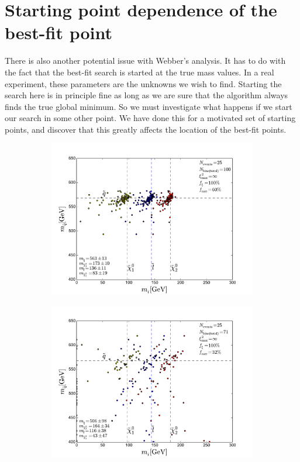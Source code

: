 \documentclass[twoside,english]{uiofysmaster}
\begin{document}
\section{Starting point dependence of the best-fit point}
\label{sec:SP-dependence_webber}
There is also another potential issue with Webber's analysis. It has to do with the fact that the best-fit search is started at the true mass values.  In a real experiment, these parameters are the unknowns we wish to find. Starting the search here is in principle fine as long as we are sure that the algorithm always finds the true global minimum. So we must investigate what happens if we start our search in some other point. We have done this for a motivated set of starting points, and discover that this greatly affects the location of the best-fit points.
\begin{figure}[hbtp!]
	\centering
	\begin{subfigure}[b]{0.45\textwidth}
		\includegraphics[width=\textwidth]{figures/webber_rec_table/webber_HW-rec_nocut.pdf} 
		\caption{ }
    \label{fig:starting_point_sensitivity_combinatorics_a}
	\end{subfigure}
	\begin{subfigure}[b]{0.45\textwidth}
		\includegraphics[width=\textwidth]{figures/webber_rec_table/webber-rec_wrong_starting_point-400-300-200-100_lowtol.pdf}
		\caption{ } 
	\end{subfigure}


\end{figure}
\end{document}
